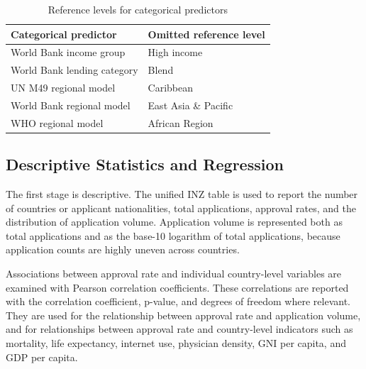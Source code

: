 \documentclass[runningheads]{llncs}
\begin{document}
\begin{table}
\caption{Reference levels for categorical predictors}
\label{tab:categorical-reference-levels}
\centering
\renewcommand{\arraystretch}{1.2}
\setlength{\tabcolsep}{7pt}
\begin{tabular}{ll}
\hline
Categorical predictor & Omitted reference level \\
\hline
World Bank income group & High income \\
World Bank lending category & Blend \\
UN M49 regional model & Caribbean \\
World Bank regional model & East Asia \& Pacific \\
WHO regional model & African Region \\
\hline
\end{tabular}
\end{table}

\subsection{Descriptive Statistics and Regression}

The first stage is descriptive. The unified INZ table is used to report the number of countries or applicant nationalities, total applications, approval rates, and the distribution of application volume. Application volume is represented both as total applications and as the base-10 logarithm of total applications, because application counts are highly uneven across countries.

Associations between approval rate and individual country-level variables are examined with Pearson correlation coefficients. These correlations are reported with the correlation coefficient, p-value, and degrees of freedom where relevant. They are used for the relationship between approval rate and application volume, and for relationships between approval rate and country-level indicators such as mortality, life expectancy, internet use, physician density, GNI per capita, and GDP per capita.
\end{document}
